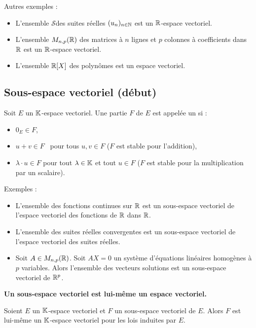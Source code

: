 \documentclass[10pt,class=article,crop=false]{standalone}
\begin{document}
\begin{multicols}{2}
Autres exemples :
\begin{itemize}
	\item L'ensemble $\mathcal{S}$des suites réelles $(u_n)_{n\in \mathbb{N}}$ est un $\mathbb{R}$-espace vectoriel.
	\item L'ensemble $M_{n,p}(\mathbb{R})$ des matrices à $n$ lignes et $p$ colonnes à coefficients dans $\mathbb{R}$ est un $\mathbb{R}$-espace vectoriel.
	\item L'ensemble $\mathbb{R}[X]$ des polynômes est un espace vectoriel. 
\end{itemize}


\subsection{Sous-espace vectoriel (début)}

\begin{definition}
Soit $E$ un $\mathbb{K}$-espace vectoriel. Une partie $F$ de $E$
est appelée un  si :
\begin{itemize}
	\item $0_E \in F$,
	
	\item $u+v \in F$ \  pour tous $u,v \in F$ ($F$ est stable pour l'addition),
	
	\item $\lambda \cdot u \in F$ pour tout $\lambda \in \mathbb{K}$ et tout $u \in F$ ($F$ est
	stable pour la multiplication par un scalaire).
\end{itemize}
\end{definition}

Exemples :
\begin{itemize}
	\item L'ensemble des fonctions continues sur $\mathbb{R}$ est un sous-espace vectoriel
	de l'espace vectoriel des fonctions de $\mathbb{R}$ dans $\mathbb{R}$. 
	
	\item L'ensemble des suites réelles convergentes est un
	sous-espace vectoriel de l'espace vectoriel des suites réelles.
	
	\item Soit $A \in M_{n,p}(\mathbb{R})$.
	Soit $AX = 0$ un système d'équations linéaires homogènes à $p$ variables.
	Alors l'ensemble des vecteurs solutions est un sous-espace vectoriel de $\mathbb{R}^p$.
\end{itemize}

\textbf{Un sous-espace vectoriel est lui-même un espace vectoriel.}
\begin{theoreme}
	\label{th:sevisev}
	Soient $E$ un $\mathbb{K}$-espace vectoriel et $F$ un sous-espace vectoriel de $E$.
	Alors $F$ est lui-même un $\mathbb{K}$-espace vectoriel pour les lois
	induites par $E$.
\end{theoreme}



\end{multicols}
\end{document}
